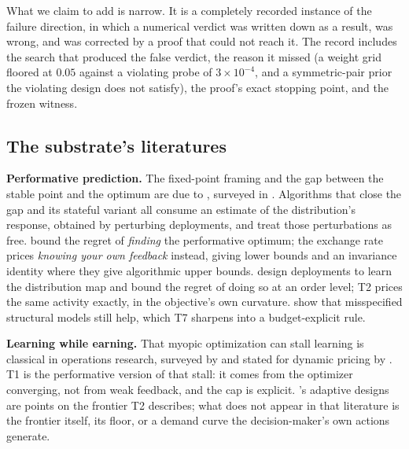 What we claim to add is narrow. It is a completely recorded instance of the
failure direction, in which a numerical verdict was written down as a result,
was wrong, and was corrected by a proof that could not reach it. The record
includes the search that produced the false verdict, the reason it missed
(a weight grid floored at $0.05$ against a violating probe of
$3 \times 10^{-4}$, and a symmetric-pair prior the violating design does not
satisfy), the proof's exact stopping point, and the frozen witness.

\subsection{The substrate's literatures}

\textbf{Performative prediction.} The fixed-point framing and the gap between
the stable point and the optimum are due to \citet{perdomo2020performative},
surveyed in \citet{hardt2023performative}. Algorithms that close the gap
\citep{izzo2021learn,miller2021outside,drusvyatskiy2022stochastic}
and its stateful variant \citep{brown2022performative} all
consume an estimate of the distribution's response, obtained by perturbing
deployments, and treat those perturbations as free.
\citet{jagadeesan2022regret} bound the regret of \emph{finding} the
performative optimum; the exchange rate prices \emph{knowing your own
feedback} instead, giving lower bounds and an invariance identity where they
give algorithmic upper bounds. \citet{bracale2025reverse} design deployments
to learn the distribution map and bound the regret of doing so at an order
level; T2 prices the same activity exactly, in the objective's own curvature.
\citet{lin2024plugin} show that misspecified structural models still help,
which T7 sharpens into a budget-explicit rule.

\textbf{Learning while earning.} That myopic optimization can stall learning is
classical in operations research, surveyed by \citet{denboer2015dynamic} and
stated for dynamic pricing by \citet{keskin2014dynamic}. T1 is the
performative version of that stall: it comes from the optimizer converging,
not from weak feedback, and the cap is explicit. \citet{lai1979adaptive}'s
adaptive designs are points on the frontier T2 describes; what does not appear
in that literature is the frontier itself, its floor, or a demand curve the
decision-maker's own actions generate.

